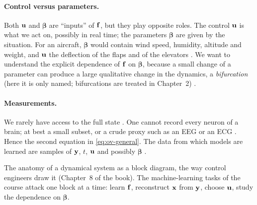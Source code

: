 \begin{paracol}{2}
\paragraph{Control versus parameters.} Both $\vb u$ and $\boldsymbol\beta$ are ``inputs'' of $\vb f$,
but they play opposite roles. The control $\vb u$ is what we act on, possibly in real time; the
parameters $\boldsymbol\beta$ are given by the situation. For an aircraft, $\boldsymbol\beta$ would
contain wind speed, humidity, altitude and weight, and $\vb u$ the deflection of the flaps and of the
elevators . We want to understand the explicit dependence of $\vb f$ on
$\boldsymbol\beta$, because a small change of a parameter can produce a large qualitative change in the
dynamics, a \emph{bifurcation} (here it is only named; bifurcations are treated in Chapter~2) .

\paragraph{Measurements.} We rarely have access to the full state . One cannot record
every neuron of a brain; at best a small subset, or a crude proxy such as an EEG or an ECG
. Hence the second equation in \eqref{eq:ov-general}. The data from which models are
learned are samples of $\vb y$, $t$, $\vb u$ and possibly $\boldsymbol\beta$ .

\begin{nfigure}
\caption{The anatomy of a dynamical system as a block diagram, the way control engineers draw it
(Chapter~8 of the book). The machine-learning tasks of the course attack one block at a time: learn
$\vb f$, reconstruct $\vb x$ from $\vb y$, choose $\vb u$, study the dependence on
$\boldsymbol\beta$.}\label{fig:ov-anatomy}
\end{nfigure}


\end{paracol}
